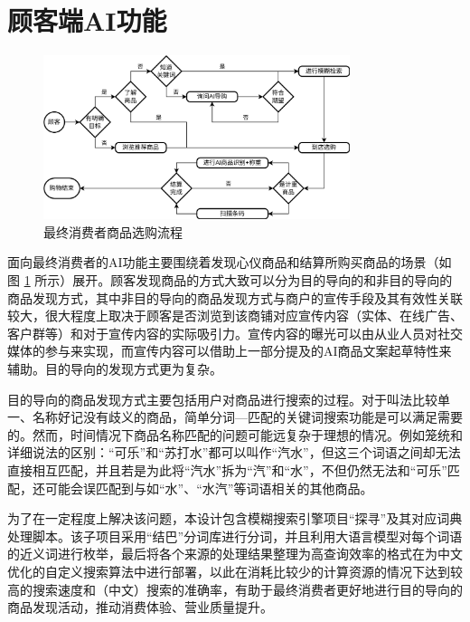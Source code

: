 \newpage
\section{顾客端AI功能}
\label{sec:guest_features}

\begin{figure}[htbp]
	\centering
	\includegraphics[width=0.8\textwidth]{./imgs/choose-n-buy.png}
	\caption{最终消费者商品选购流程}
	\label{fig:choose-n-buy}
\end{figure}

面向最终消费者的AI功能主要围绕着发现心仪商品和结算所购买商品的场景（如图 \ref{fig:choose-n-buy} 所示）展开。顾客发现商品的方式大致可以分为目的导向的和非目的导向的商品发现方式，其中非目的导向的商品发现方式与商户的宣传手段及其有效性关联较大，很大程度上取决于顾客是否浏览到该商铺对应宣传内容（实体、在线广告、客户群等）和对于宣传内容的实际吸引力。宣传内容的曝光可以由从业人员对社交媒体的参与来实现，而宣传内容可以借助上一部分提及的AI商品文案起草特性来辅助。目的导向的发现方式更为复杂。

目的导向的商品发现方式主要包括用户对商品进行搜索的过程。对于叫法比较单一、名称好记没有歧义的商品，简单分词---匹配的关键词搜索功能是可以满足需要的。然而，时间情况下商品名称匹配的问题可能远复杂于理想的情况。例如笼统和详细说法的区别：“可乐”和“苏打水”都可以叫作“汽水”，但这三个词语之间却无法直接相互匹配，并且若是为此将“汽水”拆为“汽”和“水”，不但仍然无法和“可乐”匹配，还可能会误匹配到与如“水”、“水汽”等词语相关的其他商品。

为了在一定程度上解决该问题，本设计包含模糊搜索引擎项目“探寻”及其对应词典处理脚本。该子项目采用“结巴”分词库\cite{sun_fxsjyjieba_2025,messense_messensejieba-rs_2025}进行分词，并且利用大语言模型对每个词语的近义词进行枚举，最后将各个来源的处理结果整理为高查询效率的格式在为中文优化的自定义搜索算法中进行部署，以此在消耗比较少的计算资源的情况下达到较高的搜索速度和（中文）搜索的准确率，有助于最终消费者更好地进行目的导向的商品发现活动，推动消费体验、营业质量提升。

